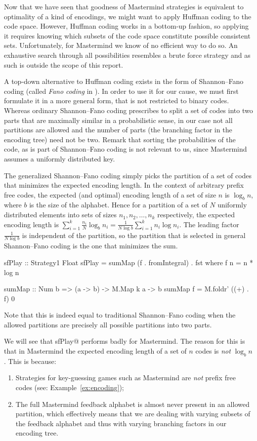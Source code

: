 \documentclass[a4paper]{article}
\makeatletter
\theoremstyle{definition}
\newcommand{\cmd}[1]{\Verb@#1@}
\newcommand{\ShFa}{Shannon--Fano}
\newcommand{\strategy}[1]{\marginpar{\bigskip\cmd{#1}}}
\makeatother
\begin{document}
Now that we have seen that goodness of Mastermind strategies is equivalent to optimality of a kind of encodings, we might want to apply Huffman coding to the code space.
However, Huffman coding works in a bottom-up fashion, so applying it requires knowing which subsets of the code space constitute possible consistent sets.
Unfortunately, for Mastermind we know of no efficient way to do so.
An exhaustive search through all possibilities resembles a brute force strategy and as such is outside the scope of this report.

A top-down alternative to Huffman coding exists in the form of \ShFa{} coding (called \emph{Fano coding} in \citep{CoverThomas1991:eit}).
In order to use it for our cause, we must first formulate it in a more general form, that is not restricted to binary codes.
Whereas ordinary \ShFa{} coding prescribes to split a set of codes into two parts that are maximally similar in a probabilistic sense, in our case not all partitions are allowed and the number of parts (the branching factor in the encoding tree) need not be two.
Remark that sorting the probabilities of the code, as is part of \ShFa{} coding is not relevant to us, since Mastermind assumes a uniformly distributed key.

The generalized \ShFa{} coding simply picks the partition of a set of codes that minimizes the expected encoding length.
In the context of arbitrary prefix free codes, the expected (and optimal) encoding length of a set of size $n$ is $\log_b n$, where $b$ is the size of the alphabet.
Hence for a partition of a set of $N$ uniformly distributed elements into sets of sizes $n_1, n_2, \ldots, n_k$ respectively, the expected encoding length is $\sum_{i=1}^k \frac{n_i}{N}\log_b n_i = \frac{1}{N\log b}\sum_{i=1}^k n_i \log n_i$.
The leading factor $\frac{1}{N\log b}$ is independent of the partition, so the partition that is selected in general \ShFa{} coding is the one that minimizes the sum.
\strategy{sfPlay}

\begin{code}
sfPlay :: Strategy1 Float
sfPlay = sumMap (f . fromIntegral) . fst
  where f n = n * log n

sumMap :: Num b => (a -> b) -> M.Map k a -> b
sumMap f = M.foldr' ((+) . f) 0
\end{code}

Note that this is indeed equal to traditional \ShFa{} coding when the allowed partitions are precisely all possible partitions into two parts.

We will see that \cmd{sfPlay} performs badly for Mastermind.
The reason for this is that in Mastermind the expected encoding length of a set of $n$ codes is \emph{not} $\log_b n$.
This is because:
\begin{enumerate}
\item Strategies for key-guessing games such as Mastermind are \emph{not} prefix free codes (see: Example~\ref{ex:encoding});
\item The full Mastermind feedback alphabet is almost never present in an allowed partition, which effectively means that we are dealing with varying subsets of the feedback alphabet and thus with varying branching factors in our encoding tree.
\end{enumerate}
\end{document}
